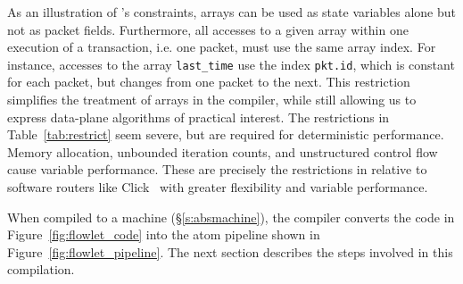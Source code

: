 As an illustration of \pktlanguage's constraints, arrays can be used as state
variables alone but not as packet fields.  Furthermore, all accesses to a given
array within one execution of a transaction, i.e. one packet, must use the same
array index. For instance, accesses to the array \texttt{last\_time} use
the index \texttt{pkt.id}, which is constant for each packet, but changes from
one packet to the next. This restriction simplifies the treatment of arrays in
the compiler, while still allowing us to express data-plane algorithms of
practical interest. The restrictions in Table~\ref{tab:restrict} seem severe,
but are required for deterministic performance.  Memory allocation, unbounded
iteration counts, and unstructured control flow cause variable performance.
These are precisely the restrictions in \pktlanguage relative to software
routers like Click~\cite{click} with greater flexibility and variable
performance.

When compiled to a \absmachine machine (\S\ref{s:absmachine}), the \pktlanguage
compiler converts the code in Figure~\ref{fig:flowlet_code} into the atom
pipeline shown in Figure~\ref{fig:flowlet_pipeline}. The next section describes
the steps involved in this compilation.
%


